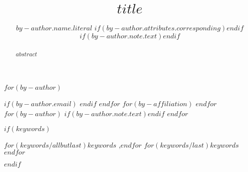 
\begin{frontmatter}

    \title{$title$}
    $for(by-author)$\author[$for(by-author.affiliations)$$it.number$$endfor$]{$by-author.name.literal$%
    $if(by-author.attributes.corresponding)$$endif$%
    $if(by-author.note.text)$$endif$}
    $if(by-author.email)$  $endif$
    $endfor$
    $for(by-affiliation)$
    $endfor$
    $for(by-author)$
    $if(by-author.note.text)$$endif$
    $endfor$
  
    \begin{abstract}
    $abstract$
    \end{abstract}
    $if(keywords)$
    \begin{keyword}
        $for(keywords/allbutlast)$$keywords$ \sep $endfor$
        $for(keywords/last)$$keywords$$endfor$
    \end{keyword}
    $endif$
      
  
\end{frontmatter}
